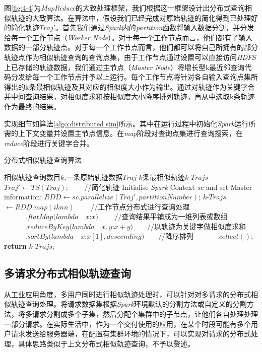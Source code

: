 图\ref{fig:4-4}为\emph{MapReduce}的大致处理框架，我们根据这一框架设计出分布式查询相似轨迹的大致算法。在算法中，假设我们已经完成对原始轨迹的简化得到已处理好的简化轨迹$Traj'$。首先我们通过\emph{Spark}内的\emph{partition}函数将输入数据分割，并分发给每一个工作节点（\emph{Worker Node}）。对于每一个工作节点而言，他们都有了输入数据的一部分轨迹点。对于每一个工作节点而言，他们都可以将自己所拥有的部分轨迹点作为相似轨迹查询的查询点集，由于工作节点通过设置可以直接访问\emph{HDFS}上已存储的轨迹数据，我们通过主节点（\emph{Master Node}）将增长型k最近邻查询代码分发给每一个工作节点并予以上运行。每个工作节点将针对各自输入查询点集所得出的k条最相似轨迹及其对应的相似度大小作为输出。通过对轨迹作为关键字合并中间查询结果，对相似度求和按相似度大小降序排列轨迹，再从中选取k条轨迹作为最终的结果。

实现细节如算法\ref{algo:distributed sim}所示。其中在运行过程中初始化\emph{Spark}运行所需的上下文变量并设置主节点信息。在\emph{map}阶段对查询点集进行查询搜索，在\emph{reduce}阶段进行关键字合并。

\begin{algorithm}
\caption{分布式相似轨迹查询算法}
\label{algo:distributed sim}
\begin{algorithmic}[1] %
\Require 相似轨迹查询数目$k$,一条原始轨迹数据$Traj$%
\Ensure $k$条最相似轨迹$k$-$Trajs$ %
\State $Traj' \gets TS(Traj)$; $\qquad$//简化轨迹
\State Initialise \emph{Spark} Context $sc$ and set Master information;
\State $RDD \gets sc.parallelize(Traj', partitionNumber)$;
\State $k$-$Trajs$ $\gets RDD.map(iknn) $ $\qquad$//工作节点分布式进行查询处理
\State $\qquad\quad.flatMap(lambda\quad x$:$x)$ $\qquad$//查询结果平铺成为一维列表或数组
\State $\qquad\quad.reduceByKey(lambda\quad x,y$:$x+y)$$\qquad$//以轨迹为关键字做相似度求和
\State $\quad\qquad.sortBy(lambda\quad x$:$x[1], descending)$$\qquad$//降序排列
\State $\quad\qquad.collect()$;
\State \textbf{return} $k$-$Trajs$; 
\end{algorithmic}
\end{algorithm}


\subsection{多请求分布式相似轨迹查询}
\label{subsec:distributed multiple}
从工业应用角度，多用户同时进行相似轨迹处理时，可以针对对多请求的分布式相似轨迹查询处理。将请求数据集根据\emph{Spark}环境默认的分割方法或自定义的分割方法，将多请求分割成多个子集，然后分配个集群中的子节点，让他们各自处理处理一部分请求。在实际生活中，作为一个交付使用的应用，在某个时段可能有多个用户请求发送给服务器端，在配置有集群环境的情况下，可以实现对请求的分布式处理，具体思路类似于上文分布式相似轨迹查询，不予以赘述。

